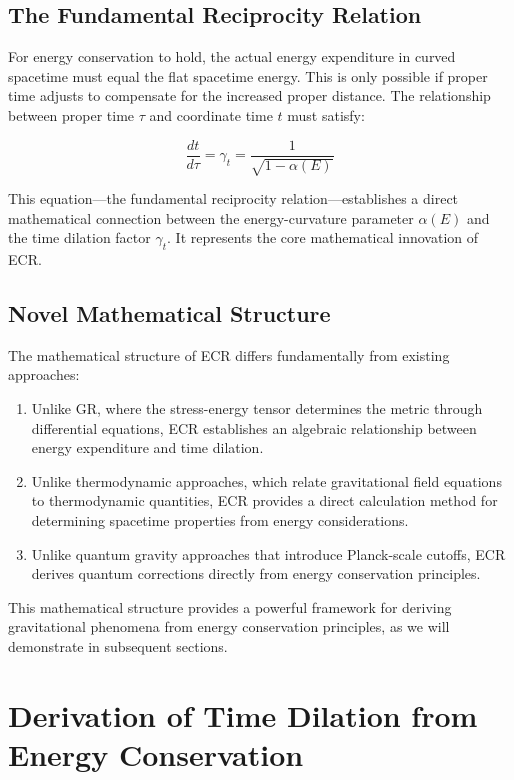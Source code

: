 \documentclass[11pt,a4paper]{article}
\begin{document}
\subsection{The Fundamental Reciprocity Relation}
For energy conservation to hold, the actual energy expenditure in curved spacetime must equal the flat spacetime energy. This is only possible if proper time adjusts to compensate for the increased proper distance. The relationship between proper time $\tau$ and coordinate time $t$ must satisfy:

\begin{equation}
    \frac{dt}{d\tau} = \gamma_t = \frac{1}{\sqrt{1-\alpha(E)}}
\end{equation}

This equation—the fundamental reciprocity relation—establishes a direct mathematical connection between the energy-curvature parameter $\alpha(E)$ and the time dilation factor $\gamma_t$. It represents the core mathematical innovation of ECR.

\subsection{Novel Mathematical Structure}
The mathematical structure of ECR differs fundamentally from existing approaches:

\begin{enumerate}
    \item Unlike GR, where the stress-energy tensor determines the metric through differential equations, ECR establishes an algebraic relationship between energy expenditure and time dilation.
    
    \item Unlike thermodynamic approaches, which relate gravitational field equations to thermodynamic quantities, ECR provides a direct calculation method for determining spacetime properties from energy considerations.
    
    \item Unlike quantum gravity approaches that introduce Planck-scale cutoffs, ECR derives quantum corrections directly from energy conservation principles.
\end{enumerate}

This mathematical structure provides a powerful framework for deriving gravitational phenomena from energy conservation principles, as we will demonstrate in subsequent sections.

\section{Derivation of Time Dilation from Energy Conservation}\label{sec:timedilation}
\end{document}
